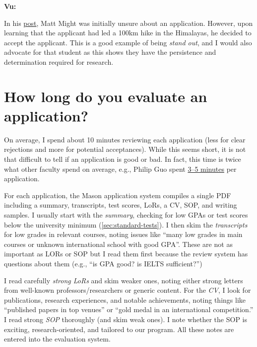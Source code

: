 \documentclass[oneside,11pt,dvipsnames]{book}
\newenvironment{commentbox}[1][]{
  \small
  \begin{mybox}
    {\small \textbf{#1}}
  }{
  \end{mybox}
}
\begin{document}
\begin{commentbox}[Vu:]
In his \href{https://matt.might.net/articles/how-to-apply-and-get-in-to-graduate-school-in-science-mathematics-engineering-or-computer-science/}{post}, Matt Might was initially unsure about an application. However, upon learning that the applicant had led a 100km hike in the Himalayas, he decided to accept the applicant.  This is a good example of being \emph{stand out}, and I would also advocate for that student as this shows they have the persistence and determination required for research.
\end{commentbox}


\section{How long do you evaluate an application?}\label{sec:ievaluate}

On average, I spend about 10 minutes reviewing each application (less for clear rejections and more for potential acceptances). While this seems short, it is not that difficult to tell if an application is good or bad.  In fact, this time
is twice what other faculty spend on average, e.g., Philip Guo spent \href{https://pg.ucsd.edu/PhD-application-tips.htm}{3--5 minutes} per application.

For each application, the Mason application system compiles a single PDF including a summary, transcripts, test scores, LoRs, a CV, SOP, and writing samples. I usually start with the \emph{summary}, checking for low GPAs or test scores below the university minimum (\autoref{sec:standard-tests}). I then skim the \emph{transcripts} for low grades in relevant courses, noting issues like ``many low grades in main courses or unknown international school with good GPA''.  These are not as important as LORs or SOP but I read them first because the review system has questions about them (e.g., ``is GPA good? is IELTS sufficient?'')

I read carefully \emph{strong LoRs} and skim weaker ones, noting either strong letters from well-known professors/researchers or generic content. For the \emph{CV}, I look for publications, research experiences, and notable achievements, noting things like ``published papers in top venues'' or ``gold medal in an international competition.''
I read strong \emph{SOP} thoroughly (and skim weak ones). I note whether the SOP is exciting, research-oriented, and tailored to our program. All these notes are entered into the evaluation system.
\end{document}
